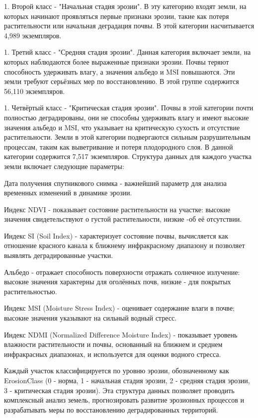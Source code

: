 \begin{multicols}{2}
1. Второй класс - "Начальная стадия эрозии". В эту категорию входят
земли, на которых начинают проявляться первые признаки эрозии, такие
как потеря растительности или начальная деградация почвы. В этой
категории насчитывается 4,989 экземпляров.

1. Третий класс - "Средняя стадия эрозии". Данная категория включает
земли, на которых наблюдаются более выраженные признаки эрозии. Почвы
теряют способность удерживать влагу, а значения альбедо и MSI
повышаются. Эти земли требуют серьёзных мер по восстановлению. В этой
группе содержится 56,110 экземпляров.

1. Четвёртый класс - "Критическая стадия эрозии". Почвы в этой категории
почти полностью деградированы, они не способны удерживать влагу и
имеют высокие значения альбедо и MSI, что указывает на критическую
сухость и отсутствие растительности. Земли в этой категории
подвергаются сильным разрушительным процессам, таким как выветривание
и потеря плодородного слоя. В данной категории содержится 7,517
экземпляров.
Структура данных для каждого участка земли включает следующие параметры:

Дата получения спутникового снимка - важнейший параметр для анализа
временных изменений в динамике эрозии.

Индекс NDVI - показывает состояние растительности на участке: высокие
значения свидетельствуют о густой растительности, низкие -об её
отсутствии.

Индекс SI (Soil Index) - характеризует состояние почвы, вычисляется как
отношение красного канала к ближнему инфракрасному диапазону и позволяет
выявлять деградированные участки.

Альбедо - отражает способность поверхности отражать солнечное излучение:
высокие значения характерны для оголённых почв, низкие - для покрытых
растительностью.

Индекс MSI (Moisture Stress Index) - оценивает содержание влаги в почве;
высокие значения указывают на сильный водный стресс.

Индекс NDMI (Normalized Difference Moisture Index) - показывает уровень
влажности растительности и почвы, основанный на ближнем и среднем
инфракрасных диапазонах, и используется для оценки водного стресса.

Каждый участок классифицируется по уровню эрозии, обозначенному как
ErosionClass (0 - норма, 1 - начальная стадия эрозии, 2 - средняя стадия
эрозии, 3 - критическая стадия эрозии). Эта структура данных позволяет
проводить комплексный анализ земель, прогнозировать развитие эрозионных
процессов и разрабатывать меры по восстановлению деградированных
территорий.


\end{multicols}
